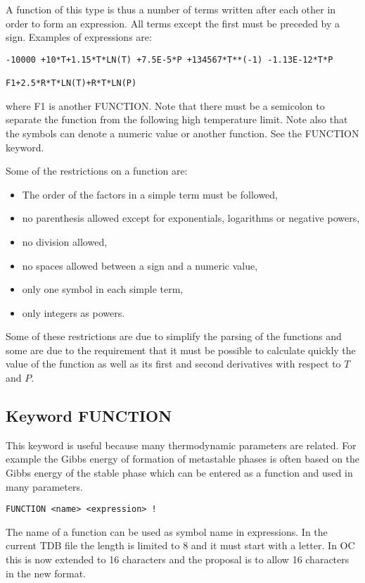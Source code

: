\documentclass[12pt]{article}
\begin{document}
A function of this type is thus a number of terms written after
each other in order to form an expression.  All terms except the first
must be preceded by a sign.  Examples of expressions are:

\begin{verbatim}
-10000 +10*T+1.15*T*LN(T) +7.5E-5*P +134567*T**(-1) -1.13E-12*T*P

F1+2.5*R*T*LN(T)+R*T*LN(P)
\end{verbatim}
where F1 is another FUNCTION.  Note that there must be a semicolon to
separate the function from the following high temperature limit.  Note
also that the symbols can denote a numeric value or another function.
See the FUNCTION keyword.

Some of the restrictions on a function are:                 
\begin{itemize}
\item The order of the factors in a simple term must be followed,
\item no parenthesis allowed except for exponentials, logarithms or
  negative powers,
\item no division allowed,                                             
\item no spaces allowed between a sign and a numeric value,            
\item only one symbol in each simple term,
\item only integers as powers.
\end{itemize}

Some of these restrictions are due to simplify the parsing of the
functions and some are due to the requirement that it must be possible
to calculate quickly the value of the function as well as its first
and second derivatives with respect to $T$ and $P$.


\subsection{Keyword FUNCTION}

This keyword is
useful because many thermodynamic parameters are related.  For example
the Gibbs energy of formation of metastable phases is often based on
the Gibbs energy of the stable phase which can be entered
as a function and used in many parameters.

\begin{verbatim}
FUNCTION <name> <expression> !
\end{verbatim}

The name of a function can be used as symbol name in
expressions.  In the current TDB file the length is limited to 8 and
it must start with a letter.  In OC this is now extended to 16
characters and the proposal is to allow 16 characters in the new
format.
\end{document}
